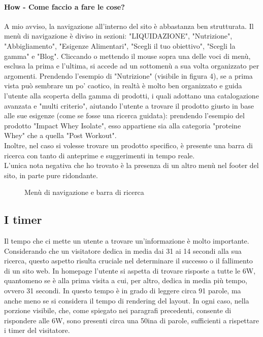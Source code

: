 \paragraph{How - Come faccio a fare le cose?}
\label{paragraph:how}
A mio avviso, la navigazione all'interno del sito è abbastanza ben strutturata. Il menù di navigazione è diviso in sezioni: "LIQUIDAZIONE", "Nutrizione", "Abbigliamento", "Esigenze Alimentari", "Scegli il tuo obiettivo", "Scegli la gamma" e "Blog".
Cliccando o mettendo il mouse sopra una delle voci di menù, esclusa la prima e l'ultima, si accede ad un sottomenù a sua volta organizzato per argomenti. Prendendo l'esempio di "Nutrizione"  (visibile in figura 4), se a prima vista può sembrare un po' caotico, in realtà è molto ben organizzato e guida l'utente alla scoperta della gamma di prodotti, i quali adottano una catalogazione avanzata e "multi criterio", aiutando l'utente a trovare il prodotto giusto in base alle sue esigenze (come se fosse una ricerca guidata): prendendo l'esempio del prodotto "Impact Whey Isolate", esso appartiene sia alla categoria "proteine Whey" che a quella "Post Workout". \\Inoltre, nel caso si volesse trovare un prodotto specifico, è presente una barra di ricerca con tanto di anteprime e suggerimenti in tempo reale.\\L'unica nota negativa che ho trovato è la presenza di un altro menù nel footer del sito, in parte pure ridondante.
\begin{figure}[!htb]
	\caption{\label{fig:figura4} Menù di navigazione e barra di ricerca}
\end{figure}
\subsection{I timer}
Il tempo che ci mette un utente a trovare un'informazione è molto importante. Considerando che un visitatore dedica in media dai 31 ai 14 secondi alla sua ricerca, questo aspetto risulta cruciale nel determinare il successo o il fallimento di un sito web. In homepage l'utente si aspetta di trovare risposte a tutte le 6W, quantomeno se è alla prima visita a cui, per altro, dedica in media più tempo, ovvero 31 secondi. In questo tempo è in grado di leggere circa 91 parole, ma anche meno se si considera il tempo di rendering del layout. In ogni caso, nella porzione visibile, che, come spiegato nei paragrafi precedenti, consente di rispondere alle 6W, sono presenti circa una 50ina di parole, sufficienti a rispettare i timer del visitatore.